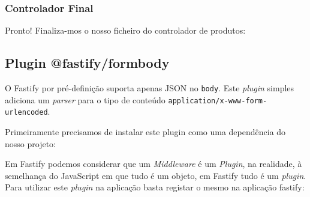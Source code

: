

\subsubsection{Controlador Final}

Pronto! Finaliza-mos o nosso ficheiro do controlador de produtos:



\subsection{Plugin @fastify/formbody}

O Fastify por pré-definição suporta apenas JSON no \texttt{body}. Este \textit{plugin} simples adiciona um \textit{parser} para o tipo de conteúdo \texttt{application/x-www-form-urlencoded}.

Primeiramente precisamos de instalar este plugin como uma dependência do nosso projeto:



Em Fastify podemos considerar que um \textit{Middleware} é um \textit{Plugin}, na realidade, à semelhança do JavaScript em que tudo é um objeto, em Fastify tudo é um \textit{plugin}. Para utilizar este \textit{plugin} na aplicação basta registar o mesmo na aplicação fastify:


